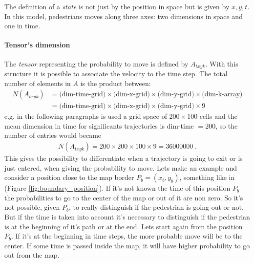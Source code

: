 \documentclass[class=article, crop=false]{standalone}
\begin{document}
The definition of a \emph{state} is not just by the position in space but is given by $x, y, t$.
In this model, pedestrians moves along three axes: two dimensions in space and one in time.

\paragraph{Tensor's dimension}
The \emph{tensor} representing the probability to move is defined by $A_{t x y k}$.
With this structure it is possible to associate the velocity to the time step.
The total number of elements in $A$ is the product between:
\begin{equation*}
\begin{split}
N(A_{t xyk}) &= \mbox{(dim-time-grid)} \times \mbox{(dim-x-grid)} \times \mbox{(dim-y-grid)} \times \mbox{(dim-k-array)} \\
& = \mbox{(dim-time-grid)} \times \mbox{(dim-x-grid)} \times \mbox{(dim-y-grid)} \times 9
\end{split}
\end{equation*}
e.g. in the following paragraphs is used a grid space of $200\times100$ cells and the mean dimension in time for significants trajectories is dim-time $ = 200$, so the number of entries would became 
\begin{equation*}
\begin{split}
N(A_{t xyk})=200 \times 200\times100\times 9 = 36000000 \; .
\end{split}
\end{equation*}
This gives the possibility to differentiate when a trajectory is going to exit or is just entered, when giving the probability to move.
Lets make an example and consider a position close to the map border $P_b = (x_b, y_b)$, something like in (Figure \ref{fig:boundary_position}).
If it's not known the time of this position $P_b$ the probabilities to go to the center of the map or out of it are non zero.
So it's not possible, given $P_b$, to really distinguish if the pedestrian is going out or not.
But if the time is taken into account it's necessary to distinguish if the pedestrian is at the beginning of it's path or at the end.
Lets start again from the position $P_b$.
If it's at the beginning in time steps, the more probable move will be to the center.
If some time is passed inside the map, it will have higher probability to go out from the map.
\end{document}
